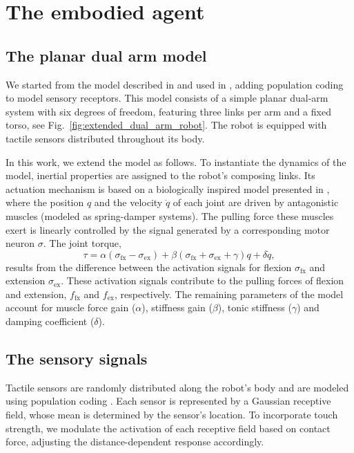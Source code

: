 \documentclass[letterpaper, 10 pt, conference]{ieeeconf}  %
\begin{document}
\section{The embodied agent}\label{sec:the_embodied_agent}
\subsection{The planar dual arm model}
We started from the model described in \cite{Mannella2018Knowyourbody} and used in \cite{Marcel2022Learningreachown}, adding population coding to model sensory receptors. This model consists of a simple planar dual-arm system with six degrees of freedom, featuring three links per arm and a fixed torso, see Fig.~\ref{fig:extended_dual_arm_robot}. The robot is equipped with tactile sensors distributed throughout its body. 

In this work, we extend the model as follows. 
To instantiate the dynamics of the model, inertial properties are assigned to the robot's composing links. Its actuation mechanism is based on a biologically inspired model presented in \cite{Shim2012Chaoticexplorationlearning}, where the position $q$ and the velocity $\dot{q}$ of each joint are driven by antagonistic muscles (modeled as spring-damper systems). The pulling force these muscles exert is linearly controlled by the signal generated by a corresponding motor neuron $\sigma$. The joint torque,
\begin{equation}\label{eq:antagonistic_torque}
	\tau = \alpha \left(\sigma_\mathrm{fx} - \sigma_\mathrm{ex}\right)  + \beta \left(\sigma_\mathrm{fx} + \sigma_\mathrm{ex} + \gamma \right) q + \delta \dot{q},
\end{equation}
results from the difference between the activation signals for flexion $ \sigma_\mathrm{fx} $ and extension $\sigma_\mathrm{ex}$. These activation signals contribute to the pulling forces of flexion and extension, $ f_\mathrm{fx}$ and $f_\mathrm{ex} $, respectively. The remaining parameters of the model account for muscle force gain ($\alpha$), stiffness gain ($\beta$), tonic stiffness ($\gamma$) and damping coefficient ($\delta$).

\subsection{The sensory signals}
Tactile sensors are randomly distributed along the robot's body and are modeled using population coding \cite{Panzeri2010PopulationCoding}. Each sensor is represented by a Gaussian receptive field, whose mean is determined by the sensor's location. To incorporate touch strength, we modulate the activation of each receptive field based on contact force, adjusting the distance-dependent response accordingly.  
\end{document}
